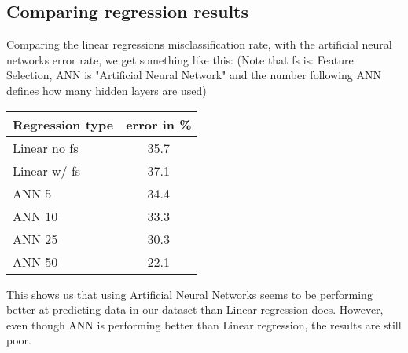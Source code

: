 \subsection{Comparing regression results}
Comparing the linear regressions misclassification rate, with the artificial neural networks error rate, we get something like this: (Note that fs is: Feature Selection, ANN is "Artificial Neural Network" and the number following ANN defines how many hidden layers are used)
\begin{table}[H]
\begin{longtable}{lc} \hline
Regression type & error in \% \\ \hline
Linear no fs & 35.7 \\
Linear w/ fs & 37.1\\
ANN 5 & 34.4 \\
ANN 10 & 33.3 \\
ANN 25 & 30.3 \\
ANN 50 & 22.1\\ \hline
\end{longtable}
\end{table}
This shows us that using Artificial Neural Networks seems to be performing better at predicting data in our dataset than Linear regression does. However, even though ANN is performing better than Linear regression, the results are still poor.